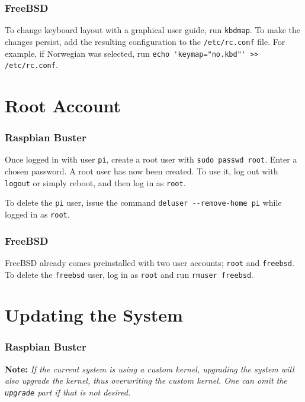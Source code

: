 \subsubsection{FreeBSD}

To change keyboard layout with a graphical user guide, run \lstinline{kbdmap}. To make the changes persist, add the resulting configuration to the \lstinline{/etc/rc.conf} file. For example, if Norwegian was selected, run \lstinline{echo 'keymap="no.kbd"' >> /etc/rc.conf}.


\section{Root Account} \label{root_account}

\subsubsection{Raspbian Buster}

Once logged in with user \lstinline{pi}, create a root user with \lstinline{sudo passwd root}. Enter a chosen password. A root user has now been created. To use it, log out with \lstinline{logout} or simply reboot, and then log in as \lstinline{root}.

To delete the \lstinline{pi} user, issue the command \lstinline{deluser --remove-home pi} while logged in as \lstinline{root}.

\subsubsection{FreeBSD}

FreeBSD already comes preinstalled with two user accounts; \lstinline{root} and \lstinline{freebsd}. To delete the \lstinline{freebsd} user, log in as \lstinline{root} and run \lstinline{rmuser freebsd}.


\section{Updating the System} \label{update_system}

\subsubsection{Raspbian Buster}

\textbf{Note:} \textit{If the current system is using a custom kernel, upgrading the system will also upgrade the kernel, thus overwriting the custom kernel. One can omit the \lstinline{upgrade} part if that is not desired.}

